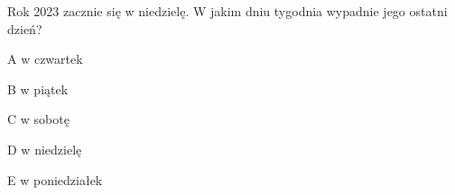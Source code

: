 \begin{tresc}
Rok 2023 zacznie się w niedzielę. W jakim dniu tygodnia wypadnie jego ostatni dzień?
\end{tresc}
\begin{wariant}{A} w czwartek \end{wariant}
\begin{wariant}{B} w piątek \end{wariant}
\begin{wariant}{C} w sobotę \end{wariant}
\begin{wariant}{D} w niedzielę \end{wariant}
\begin{wariant}{E} w poniedziałek \end{wariant}
